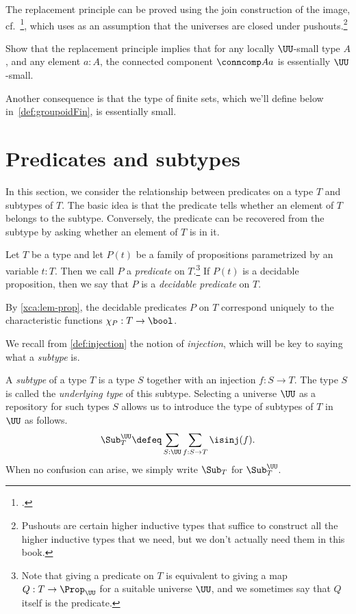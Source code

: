 The replacement principle can be proved using the join construction of the image, cf.~\citeauthor{Rijke-Join}\footcite{Rijke-Join},
which uses as an assumption that the universes
are closed under pushouts.\footnote{%
  Pushouts are certain higher inductive types that suffice
  to construct all the higher inductive types that we need,
  but we don't actually need them in this book.}
\begin{xca}\label{xca:comp-loc-small-ess-small}
  Show that the replacement principle implies that for any locally $\UU$-small type $A$,
  and any element $a:A$,
  the connected component $\conncomp A a$ is essentially $\UU$-small.
\end{xca}
Another consequence is that the type of finite sets, which we'll define below
in~\cref{def:groupoidFin}, is essentially small.


\section{Predicates and subtypes}
\label{sec:subtype}

In this section, we consider the relationship between predicates on a type $T$
and subtypes of $T$.  The basic idea is that the predicate tells
whether an element of $T$ belongs to the subtype. Conversely,
the predicate can be recovered from the subtype by asking whether an element of $T$
is in it.

\begin{definition}\label{def:predicate}
  Let $T$ be a type and let $P(t)$ be a family of propositions
  parametrized by an variable $t:T$.
  Then we call $P$ a \emph{predicate} on $T$.\footnote{%
    Note that giving a predicate on $T$ is
    equivalent to giving a map $Q: T\to\Prop_\UU$ for a suitable universe $\UU$,
    and we sometimes say that $Q$ itself is the predicate.}
  If $P(t)$ is a decidable proposition,
  then we say that $P$ is a \emph{decidable predicate} on $T$.
\end{definition}

By \cref{xca:lem-prop},  the decidable predicates $P$ on $T$
correspond uniquely to the characteristic functions $\chi_P:T\to\bool$.

We recall from \cref{def:injection} the notion of \emph{injection},
which will be key to saying what a \emph{subtype} is.


\begin{definition}\label{def:subtype}
  A \emph{subtype} of a type $T$
  is a type $S$ together with an injection $f : S \to T$. 
  The type $S$ is called the \emph{underlying type} of this subtype.
  Selecting a universe $\UU$ as a repository for such types $S$ allows 
  us to introduce the type of subtypes of $T$ in $\UU$ as follows.
  \[
  \Sub^\UU_T \defeq \sum_{S:\UU}\sum_{f:S\to T}\isinj(f).
  \]
  When no confusion can arise, we simply write $\Sub_T$ for $\Sub^\UU_T$.
\end{definition}

